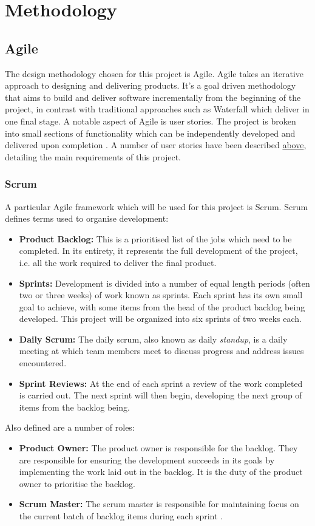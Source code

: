 \section{Methodology}
	\subsection{Agile}
	The design methodology chosen for this project is Agile. Agile takes an iterative approach to designing and delivering products. It's a goal driven methodology that aims to build and deliver software incrementally from the beginning of the project, in contrast with traditional approaches such as Waterfall which deliver in one final stage. A notable aspect of Agile is user stories. The project is broken into small sections of functionality which can be independently developed and delivered upon completion \citep{rasmusson}. A number of user stories have been described \hyperref[user-stories]{above}, detailing the main requirements of this project. 
	
	\subsubsection{Scrum}
	
	A particular Agile framework which will be used for this project is Scrum. Scrum defines terms used to organise development:
	\begin{itemize}
		\item \textbf{Product Backlog:} This is a prioritised list of the jobs which need to be completed. In its entirety, it represents the full development of the project, i.e. all the work required to deliver the final product.
		\item \textbf{Sprints:} Development is divided into a number of equal length periods (often two or three weeks) of work known as sprints. Each sprint has its own small goal to achieve, with some items from the head of the product backlog being developed. This project will be organized into six sprints of two weeks each.
		\item \textbf{Daily Scrum:} The daily scrum, also known as daily \textit{standup}, is a daily meeting at which team members meet to discuss progress and address issues encountered.
		\item \textbf{Sprint Reviews:} At the end of each sprint a review of the work completed is carried out. The next sprint will then begin, developing the next group of items from the backlog being\citep{scrum}.
	\end{itemize}
	Also defined are a number of roles:
	\begin{itemize}
		\item \textbf{Product Owner:} The product owner is responsible for the backlog. They are responsible for ensuring the development succeeds in its goals by implementing the work laid out in the backlog. It is the duty of the product owner to prioritise the backlog. 
		\item \textbf{Scrum Master:} The scrum master is responsible for maintaining focus on the current batch of backlog items during each sprint \cite{agile}.
	\end{itemize}
	
